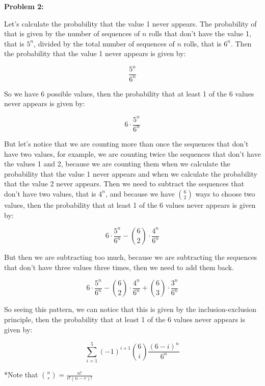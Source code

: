 \textbf{Problem 2:}

\singlespacing

Let's calculate the probability that the value 1 never appears. The probability
of that is given by the number of sequences of $n$ rolls that don't have the value 1,
that is $5^n$, divided by the total number of sequences of $n$ rolls, that is $6^n$.
Then the probability that the value 1 never appears is given by:

\singlespacing

\begin{equation}
    \frac{5^n}{6^n}
\end{equation}

\singlespacing

So we have 6 possible values, then the probability that at least 1 of the 6 values
never appears is given by:

\singlespacing

\begin{equation}
    6 \cdot\frac{5^n}{6^n}
\end{equation}

\singlespacing

But let's notice that we are counting more than once the sequences that don't have
two values, for example, we are counting twice the sequences that don't have the
values 1 and 2, because we are counting them when we calculate the probability that
the value 1 never appears and when we calculate the probability that the value 2 never
appears. Then we need to subtract the sequences that don't have two values, that is
$4^n$, and because we have $\binom{6}{2}$ ways to choose two values, then the probability
that at least 1 of the 6 values never appears is given by:

\singlespacing

\begin{equation}
    6 \cdot\frac{5^n}{6^n} - \binom{6}{2} \cdot \frac{4^n}{6^n}
\end{equation}

\singlespacing

But then we are subtracting too much, because we are subtracting the sequences that
don't have three values three times, then we need to add them back.

\singlespacing

\begin{equation}
    6 \cdot\frac{5^n}{6^n} - \binom{6}{2} \cdot \frac{4^n}{6^n} + \binom{6}{3} \cdot \frac{3^n}{6^n}
\end{equation}

\singlespacing

So seeing this pattern, we can notice that this is given by the inclusion-exclusion principle,
then the probability that at least 1 of the 6 values never appears is given by:

\singlespacing

\begin{equation}
    \sum_{i=1}^{5} (-1)^{i+1} \binom{6}{i} \frac{(6 - i)^n}{6^n}
\end{equation}

\singlespacing

*Note that $\binom{n}{r} = \frac{n!}{r! (n - r)!}$